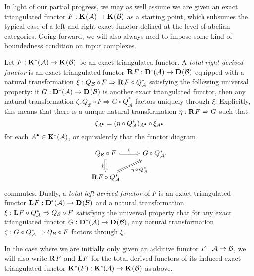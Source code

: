 In light of our partial progress, we may as well assume we are given
an exact triangulated functor $F: \homcat{\abcat{A}} \to
\homcat{\abcat{B}}$ as a starting point, which subsumes the typical
case of a left and right exact functor defined at the level of
abelian categories.
Going forward, we will also always need to impose some kind of
boundedness condition on input complexes.

\begin{definition}
  \label{def_total_derfunc}
  Let $F: \homcat[*]{\abcat{A}} \to \homcat{\abcat{B}}$ be an exact
  triangulated functor.
  A \emph{total right derived functor} is an exact triangulated
  functor $\rightderfunc{F}: \dercat[*]{\abcat{A}} \to
  \dercat{\abcat{B}}$ equipped with a natural transformation $\xi:
  Q_{\mathcal{B}} \circ F \Rightarrow \rightderfunc{F} \circ
  Q_{\mathcal{A}}^*$ satisfying the following universal property:
  if $G: \dercat[*]{\abcat{A}} \to \dercat{\abcat{B}}$ is another
  exact triangulated functor, then any natural transformation $\zeta:
  Q_{\mathcal{B}} \circ F \Rightarrow G \circ Q_{\mathcal{A}}^*$
  factors uniquely through $\xi$.
  Explicitly, this means that there is a unique natural
  transformation $\eta: \rightderfunc{F} \Rightarrow G$ such that
  \[
    \zeta_{\cochaincomp{A}}
    = (\eta \circ Q_{\abcat{A}}^*)_{\cochaincomp{A}} \circ \xi_{\cochaincomp{A}}
  \]
  for each $\cochaincomp{A} \in \homcat[*]{\abcat{A}}$, or
  equivalently that the functor diagram
  \[
    \begin{tikzcd}
      {Q_{\abcat{B}} \circ F} & {G \circ Q_{\abcat{A}}^*}. \\
      {\rightderfunc{F} \circ Q_{\abcat{A}}^*} & {}
      \arrow["\zeta", Rightarrow, from=1-1, to=1-2]
      \arrow["\xi"', Rightarrow, from=1-1, to=2-1]
      \arrow["{\eta \, \circ \, Q_{\abcat{A}}^*}"', Rightarrow,
      from=2-1, to=1-2]
    \end{tikzcd}
  \]
  commutes.
  Dually, a \emph{total left derived functor} of $F$ is an exact
  triangulated functor $\leftderfunc{F}: \dercat[*]{\abcat{A}} \to
  \dercat{\abcat{B}}$ and a natural transformation $\xi:
  \leftderfunc{F} \circ Q_{\mathcal{A}}^* \nattrans Q_{\mathcal{B}}
  \circ F$ satisfying the universal property that for any exact
  triangulated functor $G: \dercat[*]{\abcat{A}} \to
  \dercat{\abcat{B}}$, any natural transformation $\zeta: G \circ
  Q_{\mathcal{A}}^* \nattrans Q_{\mathcal{B}} \circ F$ factors through $\xi$.
\end{definition}

In the case where we are initially only given an additive functor $F:
\abcat{A} \to \abcat{B}$, we will also write $\rightderfunc{F}$ and
$\leftderfunc{F}$ for the total derived functors of its induced exact
triangulated functor $\homcat[*]{F}: \homcat[*]{\abcat{A}} \to
\homcat{\abcat{B}}$ as above.

